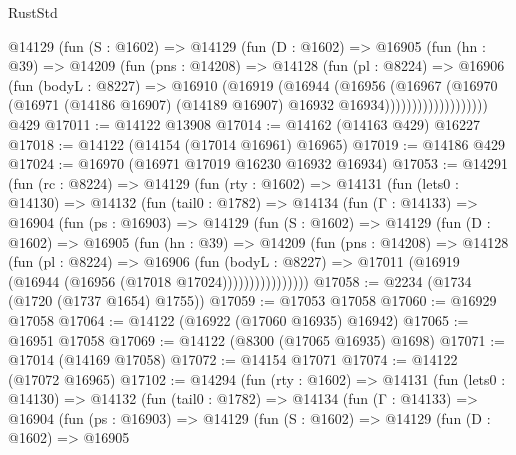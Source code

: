 \begin{lexlean}{RustStd}
\begin{coremodule}
                @14129
                  (fun (S : @1602) =>
                  @14129
                    (fun (D : @1602) =>
                    @16905
                      (fun (hn : @39) =>
                      @14209
                        (fun (pns : @14208) =>
                        @14128
                          (fun (pl : @8224) =>
                          @16906
                            (fun (bodyL : @8227) =>
                            @16910
                              (@16919
                                (@16944
                                  (@16956
                                    (@16967
                                      (@16970
                                        (@16971
                                          (@14186 @16907)
                                          (@14189 @16907)
                                          @16932
                                          @16934)))))))))))))))))))
    @429
@17011 := @14122 @13908
@17014 := @14162 (@14163 @429) @16227
@17018 := @14122 (@14154 (@17014 @16961) @16965)
@17019 := @14186 @429
@17024 := @16970 (@16971 @17019 @16230 @16932 @16934)
@17053 := @14291
    (fun (rc : @8224) =>
    @14129
      (fun (rty : @1602) =>
      @14131
        (fun (lets0 : @14130) =>
        @14132
          (fun (tail0 : @1782) =>
          @14134
            (fun (Γ : @14133) =>
            @16904
              (fun (ps : @16903) =>
              @14129
                (fun (S : @1602) =>
                @14129
                  (fun (D : @1602) =>
                  @16905
                    (fun (hn : @39) =>
                    @14209
                      (fun (pns : @14208) =>
                      @14128
                        (fun (pl : @8224) =>
                        @16906
                          (fun (bodyL : @8227) =>
                          @17011 (@16919 (@16944 (@16956 (@17018 @17024))))))))))))))))
@17058 := @2234 (@1734 (@1720 (@1737 @1654) @1755))
@17059 := @17053 @17058
@17060 := @16929 @17058
@17064 := @14122 (@16922 (@17060 @16935) @16942)
@17065 := @16951 @17058
@17069 := @14122 (@8300 (@17065 @16935) @1698)
@17071 := @17014 (@14169 @17058)
@17072 := @14154 @17071
@17074 := @14122 (@17072 @16965)
@17102 := @14294
    (fun (rty : @1602) =>
    @14131
      (fun (lets0 : @14130) =>
      @14132
        (fun (tail0 : @1782) =>
        @14134
          (fun (Γ : @14133) =>
          @16904
            (fun (ps : @16903) =>
            @14129
              (fun (S : @1602) =>
              @14129
                (fun (D : @1602) =>
                @16905

\end{coremodule}
\end{lexlean}
